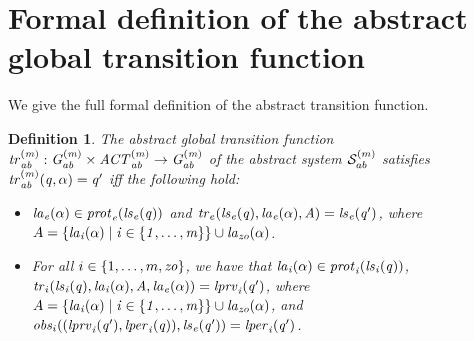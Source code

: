\documentclass{article}
\newtheorem{definition}{Definition}
\begin{document}
\section{Formal definition of the abstract global transition function} 
We give the full formal definition of the abstract transition function.
\begin{definition}
  The {\em abstract global transition function} $\it{tr}^{(m)}_{ab} : G^{(m)}_{ab}
  \times \mathit{ACT}^{(m)}_{ab} \rightarrow G^{(m)}_{ab}$ of the abstract 
  system $\mathcal{S}^{(m)}_{ab}$ satisfies $\it{tr}^{(m)}_{ab}(q, \alpha) = q'$ iff the
  following hold:
  \begin{itemize}
    \item $\it{la}_{e}({\alpha}) \in \mathit{prot}_{e}({\it{ls}_{e}(q)})$ and $\mathit{tr}_{e}(\it{ls}_{e}(q),
        \it{la}_{e}({\alpha}), A) = \it{ls}_{e}(q')$, where
    $A = \left \{ \it{la}_{i}({\alpha}) \mid i \in \left \{ 1,\ldots,m \right \} \right \} \cup
\it{la}_{zo}({\alpha})$.
    \item For all $i \in \left \{ 1,\ldots,m, \it{zo} \right \}$, we have that
    $\it{la}_{i}({\alpha}) \in \mathit{prot}_{i}(\it{ls}_{i}(q))$, $\mathit{tr}_{i} (\it{ls}_{i}(q), \it{la}_{i}({\alpha}),
    A, \it{la}_{e}({\alpha})) = \it{lprv}_{i}(q')$, where  $A = \left \{ \it{la}_{i}({\alpha}) \mid i \in
    \left \{ 1,\ldots,m \right \} \right \} \cup \it{la}_{zo}({\alpha})$, and $\mathit{obs}_{i}((\it{lprv}_{i}(q'),\it{lper}_{i}(q)),\it{ls}_{e}(q')) = \it{lper}_{i}(q')$.
  \end{itemize}
\end{definition}
\end{document}
